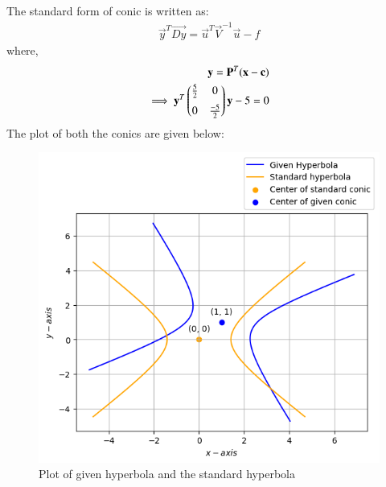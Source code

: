 The standard form of conic is written as:
\begin{align}
  \vec{y}^T\vec{Dy} = \vec{u}^T\vec{V}^{-1}\vec{u} - f
\end{align}
where,
\begin{align}
  \mathbf{y} = \mathbf{P}^T(\mathbf{x-c}) \\
  \implies \mathbf{y}^T \begin{pmatrix}\frac{5}{2} & 0 \\[0.2cm] 0 & \frac{-5}{2}\end{pmatrix} \mathbf{y} -5 = 0
\end{align}
The plot of both the conics are given below:
\begin{figure}[h!]
\centering
    \includegraphics[width=\columnwidth]{solutions/41/19/Latex/hyperbola.png}
    \caption{Plot of given hyperbola and the standard hyperbola}
    \label{eq:solutions/41/19/fig:1}
\end{figure}
